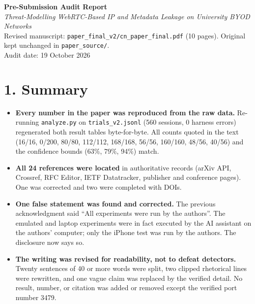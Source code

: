 \documentclass[10pt,a4paper]{article}
\begin{document}
\begin{center}
{\Large\bfseries Pre-Submission Audit Report}\\[3pt]
\textit{Threat-Modelling WebRTC-Based IP and Metadata Leakage on University BYOD Networks}\\[2pt]
Revised manuscript: \texttt{paper\_final\_v2/cn\_paper\_final.pdf} (10 pages). Original kept unchanged in \texttt{paper\_source/}.\\
Audit date: 19 October 2026
\end{center}

\section*{1. Summary}
\begin{itemize}
\item \textbf{Every number in the paper was reproduced from the raw data.} Re-running \texttt{analyze.py} on \texttt{trials\_v2.jsonl} (560 sessions, 0 harness errors) regenerated both result tables byte-for-byte. All counts quoted in the text (16/16, 0/200, 80/80, 112/112, 168/168, 56/56, 160/160, 48/56, 40/56) and the confidence bounds (63\%, 79\%, 94\%) match.
\item \textbf{All 24 references were located} in authoritative records (arXiv API, Crossref, RFC Editor, IETF Datatracker, publisher and conference pages). One was corrected and two were completed with DOIs.
\item \textbf{One false statement was found and corrected.} The previous acknowledgment said ``All experiments were run by the authors''. The emulated and laptop experiments were in fact executed by the AI assistant on the authors' computer; only the iPhone test was run by the authors. The disclosure now says so.
\item \textbf{The writing was revised for readability, not to defeat detectors.} Twenty sentences of 40 or more words were split, two clipped rhetorical lines were rewritten, and one vague claim was replaced by the verified detail. No result, number, or citation was added or removed except the verified port number 3479.
\end{itemize}
\end{document}
